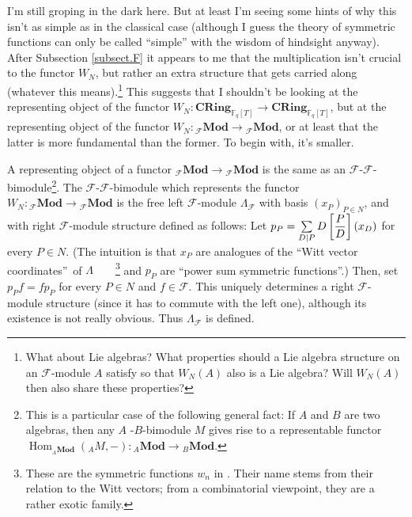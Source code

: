 \documentclass[numbers=enddot,12pt,final,onecolumn,notitlepage]{scrartcl}%
\theoremstyle{definition}
\let\sumnonlimits\sum
\renewcommand{\sum}{\sumnonlimits\limits}
\begin{document}
I'm still groping in the dark here. But at least I'm seeing some hints of why
this isn't as simple as in the classical case (although I guess the theory of
symmetric functions can only be called ``simple'' with the wisdom of hindsight
anyway). After Subsection \ref{subsect.F} it appears to me that the
multiplication isn't crucial to the functor $W_{N}$, but rather an extra
structure that gets carried along (whatever this means).\footnote{What about
Lie algebras? What properties should a Lie algebra structure on an
$\mathcal{F}$-module $A$ satisfy so that $W_{N}\left(  A\right)  $ also is a
Lie algebra? Will $W_{N}\left(  A\right)  $ then also share these properties?}
This suggests that I shouldn't be looking at the representing object of the
functor $W_{N}:\mathbf{CRing}_{\mathbb{F}_{q}\left[  T\right]  }%
\rightarrow\mathbf{CRing}_{\mathbb{F}_{q}\left[  T\right]  }$, but at the
representing object of the functor $W_{N}:\left.  _{\mathcal{F}}%
\mathbf{Mod}\right.  \rightarrow\left.  _{\mathcal{F}}\mathbf{Mod}\right.  $,
or at least that the latter is more fundamental than the former. To begin
with, it's smaller.

A representing object of a functor $\left.  _{\mathcal{F}}\mathbf{Mod}\right.
\rightarrow\left.  _{\mathcal{F}}\mathbf{Mod}\right.  $ is the same as an
$\mathcal{F}$-$\mathcal{F}$-bimodule\footnote{This is a particular case of the
following general fact: If $A$ and $B$ are two algebras, then any $A$%
-$B$-bimodule $M$ gives rise to a representable functor $\operatorname*{Hom}%
\nolimits_{_{A}\mathbf{Mod}}\left(  _{A}M,-\right)  :\left.  _{A}%
\mathbf{Mod}\right.  \rightarrow\left.  _{B}\mathbf{Mod}\right.  $.}. The
$\mathcal{F}$-$\mathcal{F}$-bimodule which represents the functor
$W_{N}:\left.  _{\mathcal{F}}\mathbf{Mod}\right.  \rightarrow\left.
_{\mathcal{F}}\mathbf{Mod}\right.  $ is the free left $\mathcal{F}$-module
$\Lambda_{\mathcal{F}}$ with basis $\left(  x_{P}\right)  _{P\in N}$, and with
right $\mathcal{F}$-module structure defined as follows: Let $p_{P}%
=\sum\limits_{D\mid P}D\left[  \dfrac{P}{D}\right]  \left(  x_{D}\right)  $
for every $P\in N$. (The intuition is that $x_{P}$ are analogues of the
\textquotedblleft Witt vector coordinates\textquotedblright\ of $\Lambda
$\ \ \ \ \footnote{These are the symmetric functions $w_{n}$ in \cite[Exercise
2.9.3]{reiner-hopf}. Their name stems from their relation to the Witt vectors;
from a combinatorial viewpoint, they are a rather exotic family.} and $p_{P}$
are \textquotedblleft power sum symmetric functions\textquotedblright.) Then,
set $p_{P}f=fp_{P}$ for every $P\in N$ and $f\in\mathcal{F}$. This uniquely
determines a right $\mathcal{F}$-module structure (since it has to commute
with the left one), although its existence is not really obvious. Thus
$\Lambda_{\mathcal{F}}$ is defined.
\end{document}
